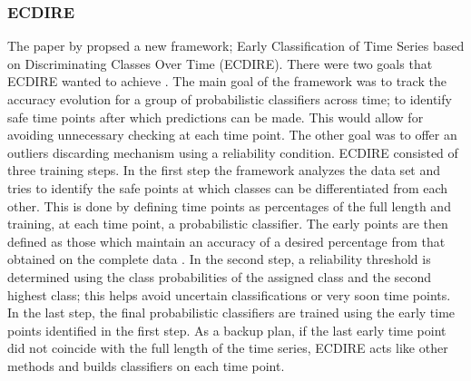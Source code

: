 \subsubsection{ECDIRE}
\label{SubsubsectionECDIRE}
The paper by \cite{mori2017reliable} propsed a new framework; Early Classification of Time Series based on Discriminating Classes Over Time (ECDIRE).
There were two goals that ECDIRE wanted to achieve \cite{mori2017early}.
The main goal of the framework was to track the accuracy evolution for a group of probabilistic classifiers across time; to identify safe time points after which
predictions can be made. This would allow for avoiding unnecessary checking at each time point. The other goal was to offer an outliers discarding mechanism using a reliability condition.
ECDIRE consisted of three training steps. In the first step the framework analyzes the data set and tries to identify the safe points at which classes can be differentiated from each other.
This is done by defining time points as percentages of the full length and training, at each time point, a probabilistic classifier.
The early points are then defined as those which maintain an accuracy of a desired percentage from that obtained on the complete data \cite{santos2016literature}.
In the second step, a reliability threshold is determined using the class probabilities of the assigned class and the second highest class;
this helps avoid uncertain classifications or very soon time points. In the last step, the final probabilistic classifiers are trained using the early time points
identified in the first step. As a backup plan, if the last early time point did not coincide with the full length of the time series, ECDIRE acts like other methods and
builds classifiers on each time point.

